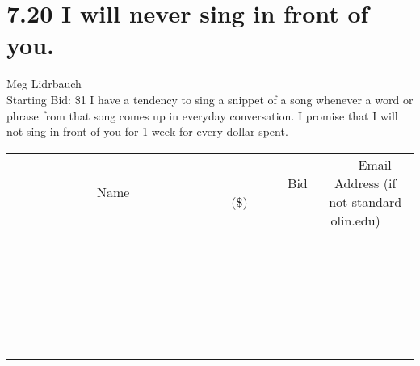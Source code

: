 \documentclass[11pt]{article}
\begin{document}
\section*{7.20 I will never sing in front of you.}
Meg Lidrbauch
\\
Starting Bid: \$1
\newline
I have a tendency to sing a snippet of a song whenever a word or phrase from that song comes up in everyday conversation. I promise that I will not sing in front of you for 1 week for every dollar spent.
\\[6ex]
\begin{tabular}{c c c}
~~~~~~~~~~~~~Name~~~~~~~~~~~~~ & ~~~~~~~~~Bid (\$)~~~~~~~~~  & ~~~Email Address (if not standard olin.edu)~~~\\
 & & \\
\hline
 & & \\
\hline
 & & \\
\hline
 & & \\
\hline
 & & \\
\hline
 & & \\
\hline
 & & \\
\hline
 & & \\
\hline
 & & \\
\hline
 & & \\
\hline
 & & \\
\hline
 & & \\
\hline
 & & \\
\hline
 & & \\
\hline
 & & \\
\hline
 & & \\
\hline
 & & \\
\hline
 & & \\
\hline
 & & \\
\hline
 & & \\
\hline
 & & \\
\hline
 & & \\
\hline
 & & \\
\hline
 & & \\
\hline
 & & \\
\hline
 & & \\
\hline
\end{tabular}
\newpage
\end{document}
